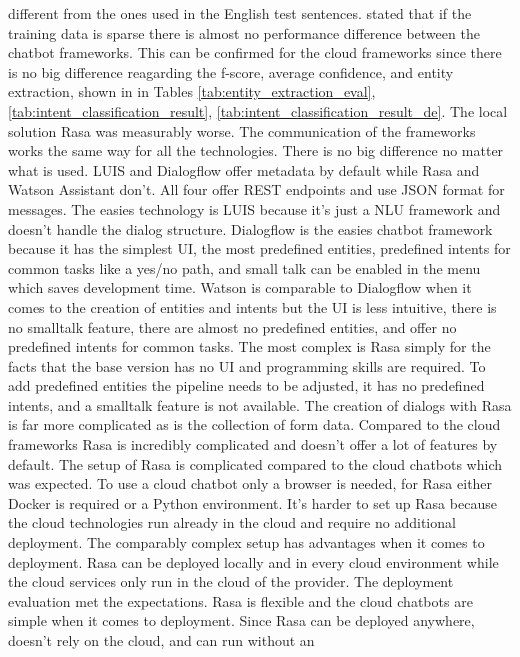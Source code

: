 different from the ones used in the English test sentences.
\citet{braunEvaluatingNLU} stated that if the training data is sparse there is almost no 
performance difference between the chatbot frameworks.
This can be confirmed for the cloud frameworks since there is no big difference reagarding the f-score, 
average confidence, and entity extraction, shown in in Tables \ref{tab:entity_extraction_eval}, \ref{tab:intent_classification_result}, \ref{tab:intent_classification_result_de}.
The local solution Rasa was measurably worse.
The communication of the frameworks works the same way for all the technologies.
There is no big difference no matter what is used.
LUIS and Dialogflow offer metadata by default while Rasa and Watson Assistant don't.
All four offer REST endpoints and use JSON format for messages.
The easies technology is LUIS because it's just a NLU framework and doesn't handle the dialog structure.
Dialogflow is the easies chatbot framework because it has the simplest UI, the most predefined entities,
predefined intents for common tasks like a yes/no path, and small talk can be enabled in the menu which 
saves development time.
Watson is comparable to Dialogflow when it comes to the creation of entities and intents but the 
UI is less intuitive, there is no smalltalk feature, there are almost no predefined entities, 
and offer no predefined intents for common tasks.
The most complex is Rasa simply for the facts that the base version has no UI and programming 
skills are required.
To add predefined entities the pipeline needs to be adjusted, it has no predefined intents, 
and a smalltalk feature is not available.
The creation of dialogs with Rasa is far more complicated as is the collection of form data.
Compared to the cloud frameworks Rasa is incredibly complicated and doesn't offer a lot of 
features by default.
The setup of Rasa is complicated compared to the cloud chatbots which was expected.
To use a cloud chatbot only a browser is needed, for Rasa either Docker is required or a Python
environment.
It's harder to set up Rasa because the cloud technologies run already in the cloud and require 
no additional deployment.
The comparably complex setup has advantages when it comes to deployment.
Rasa can be deployed locally and in every cloud environment while the cloud services only 
run in the cloud of the provider.
The deployment evaluation met the expectations.
Rasa is flexible and the cloud chatbots are simple when it comes to deployment.
Since Rasa can be deployed anywhere, doesn't rely on the cloud, and can run without an
